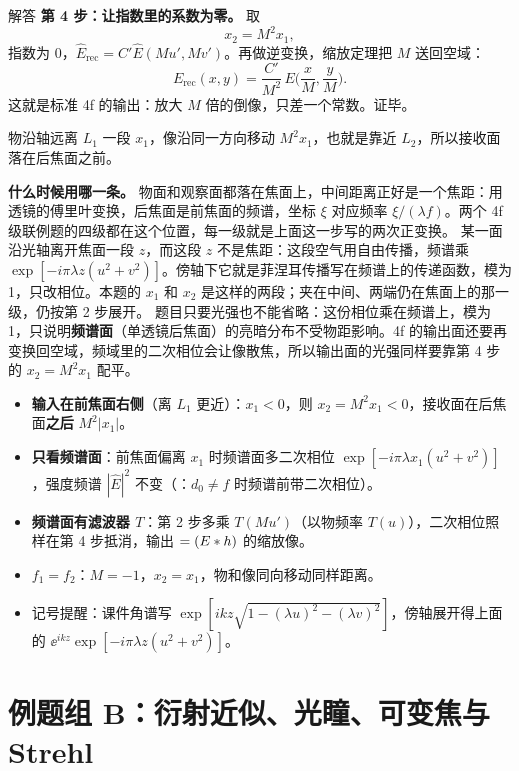 \begin{exam}{解答}
\textbf{第 4 步：让指数里的系数为零。}
取
\[
\boxed{x_2=M^2x_1},
\]
指数为 0，$\hat E_{\text{rec}}=C'\hat E(Mu',Mv')$。再做逆变换，缩放定理把 $M$ 送回空域：
\[
E_{\text{rec}}(x,y)=\frac{C'}{M^2}\,E\Big(\frac xM,\frac yM\Big).
\]
这就是标准 4f 的输出：放大 $M$ 倍的倒像，只差一个常数。证毕。

物沿轴远离 $L_1$ 一段 $x_1$，像沿同一方向移动 $M^2x_1$，也就是靠近 $L_2$，所以接收面落在后焦面之前。

\textbf{什么时候用哪一条。}
物面和观察面都落在焦面上，中间距离正好是一个焦距：用透镜的傅里叶变换，后焦面是前焦面的频谱，坐标 $\xi$ 对应频率 $\xi/(\lambda f)$。两个 4f 级联例题的四级都在这个位置，每一级就是上面这一步写的两次正变换。
某一面沿光轴离开焦面一段 $z$，而这段 $z$ 不是焦距：这段空气用自由传播，频谱乘 $\exp[-i\pi\lambda z(u^2+v^2)]$。傍轴下它就是菲涅耳传播写在频谱上的传递函数，模为 1，只改相位。本题的 $x_1$ 和 $x_2$ 是这样的两段；夹在中间、两端仍在焦面上的那一级，仍按第 2 步展开。
题目只要光强也不能省略：这份相位乘在频谱上，模为 1，只说明\textbf{频谱面}（单透镜后焦面）的亮暗分布不受物距影响。4f 的输出面还要再变换回空域，频域里的二次相位会让像散焦，所以输出面的光强同样要靠第 4 步的 $x_2=M^2x_1$ 配平。
\end{exam}

\begin{warn}[变式]
\begin{itemize}
\item \textbf{输入在前焦面右侧}（离 $L_1$ 更近）：$x_1<0$，则 $x_2=M^2x_1<0$，接收面在后焦面\textbf{之后} $M^2|x_1|$。
\item \textbf{只看频谱面}：前焦面偏离 $x_1$ 时频谱面多二次相位 $\exp[-i\pi\lambda x_1(u^2+v^2)]$，强度频谱 $|\hat E|^2$ 不变（\pageref{sec:lensFT}：$d_0\ne f$ 时频谱前带二次相位）。
\item \textbf{频谱面有滤波器 $T$}：第 2 步多乘 $T(Mu')$（以物频率 $T(u)$），二次相位照样在第 4 步抵消，输出 $=(E\ast h)$ 的缩放像。
\item \textbf{$f_1=f_2$}：$M=-1$，$x_2=x_1$，物和像同向移动同样距离。
\item 记号提醒：课件角谱写 $\exp[ikz\sqrt{1-(\lambda u)^2-(\lambda v)^2}]$，傍轴展开得上面的 $\ee^{ikz}\exp[-i\pi\lambda z(u^2+v^2)]$。
\end{itemize}
\end{warn}

\section{例题组 B：衍射近似、光瞳、可变焦与 Strehl}\label{sec:exgB}

